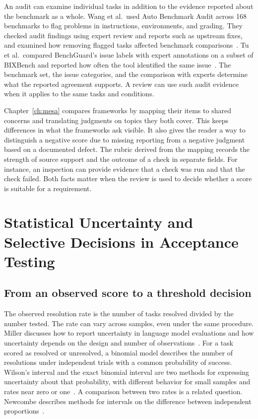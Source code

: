An audit can examine individual tasks in addition to the evidence reported about the benchmark as a whole. Wang et al.\ used Auto Benchmark Audit across 168 benchmarks to flag problems in instructions, environments, and grading. They checked audit findings using expert review and reports such as upstream fixes, and examined how removing flagged tasks affected benchmark comparisons~\cite{wang_auto_benchmark_audit_2026}. Tu et al.\ compared BenchGuard's issue labels with expert annotations on a subset of BIXBench and reported how often the tool identified the same issue~\cite{tu_benchguard_2026}. The benchmark set, the issue categories, and the comparison with experts determine what the reported agreement supports. A review can use such audit evidence when it applies to the same tasks and conditions.

Chapter~\ref{ch:mesa} compares frameworks by mapping their items to shared concerns and translating judgments on topics they both cover. This keeps differences in what the frameworks ask visible. It also gives the reader a way to distinguish a negative score due to missing reporting from a negative judgment based on a documented defect. The rubric derived from the mapping records the strength of source support and the outcome of a check in separate fields. For instance, an inspection can provide evidence that a check was run and that the check failed. Both facts matter when the review is used to decide whether a score is suitable for a requirement.

\section{Statistical Uncertainty and Selective Decisions in Acceptance Testing}
\label{sec:bg_stats}

\subsection{From an observed score to a threshold decision}

The observed resolution rate is the number of tasks resolved divided by the number tested. The rate can vary across samples, even under the same procedure. Miller discusses how to report uncertainty in language model evaluations and how uncertainty depends on the design and number of observations~\cite{miller_error_bars_2024}. For a task scored as resolved or unresolved, a binomial model describes the number of resolutions under independent trials with a common probability of success. Wilson's interval and the exact binomial interval are two methods for expressing uncertainty about that probability, with different behavior for small samples and rates near zero or one~\cite{wilson_probable_inference_1927,brown_cai_dasgupta_2001}. A comparison between two rates is a related question. Newcombe describes methods for intervals on the difference between independent proportions~\cite{newcombe_difference_1998}.

